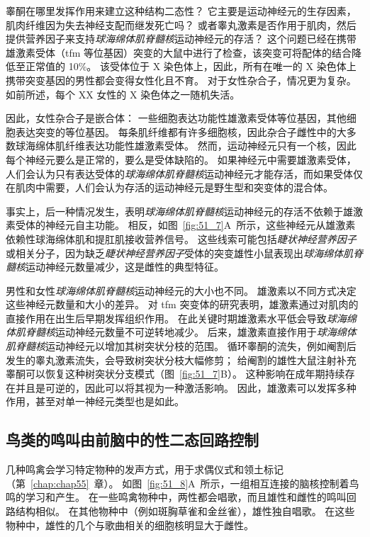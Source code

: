 睾酮在哪里发挥作用来建立这种结构二态性？
它主要是运动神经元的生存因素，肌肉纤维因为失去神经支配而继发死亡吗？
或者睾丸激素是否作用于肌肉，然后提供营养因子来支持\textit{球海绵体肌脊髓核}运动神经元的存活？
这个问题已经在携带雄激素受体（tfm 等位基因）突变的大鼠中进行了检查，该突变可将配体的结合降低至正常值的 10\%。
该受体位于 X 染色体上，因此，所有在唯一的 X 染色体上携带突变基因的男性都会变得女性化且不育。
对于女性杂合子，情况更为复杂。
如前所述，每个 XX 女性的 X 染色体之一随机失活。


因此，女性杂合子是嵌合体：
一些细胞表达功能性雄激素受体等位基因，其他细胞表达突变的等位基因。
每条肌纤维都有许多细胞核，因此杂合子雌性中的大多数球海绵体肌纤维表达功能性雄激素受体。
然而，运动神经元只有一个核，因此每个神经元要么是正常的，要么是受体缺陷的。
如果神经元中需要雄激素受体，人们会认为只有表达受体的\textit{球海绵体肌脊髓核}运动神经元才能存活，而如果受体仅在肌肉中需要，人们会认为存活的运动神经元是野生型和突变体的混合体。


事实上，后一种情况发生，表明\textit{球海绵体肌脊髓核}运动神经元的存活不依赖于雄激素受体的神经元自主功能。
相反，如图~\ref{fig:51_7}A~所示，这些神经元从雄激素依赖性球海绵体肌和提肛肌接收营养信号。
这些线索可能包括\textit{睫状神经营养因子}或相关分子，因为缺乏\textit{睫状神经营养因子}受体的突变雄性小鼠表现出\textit{球海绵体肌脊髓核}运动神经元数量减少，这是雌性的典型特征。


男性和女性\textit{球海绵体肌脊髓核}运动神经元的大小也不同。
雄激素以不同方式决定这些神经元数量和大小的差异。
对 tfm 突变体的研究表明，雄激素通过对肌肉的直接作用在出生后早期发挥组织作用。
在此关键时期雄激素水平低会导致\textit{球海绵体肌脊髓核}运动神经元数量不可逆转地减少。
后来，雄激素直接作用于\textit{球海绵体肌脊髓核}运动神经元以增加其树突状分枝的范围。
循环睾酮的流失，例如阉割后发生的睾丸激素流失，会导致树突状分枝大幅修剪；
给阉割的雄性大鼠注射补充睾酮可以恢复这种树突状分支模式（图~\ref{fig:51_7}B）。
这种影响在成年期持续存在并且是可逆的，因此可以将其视为一种激活影响。
因此，雄激素可以发挥多种作用，甚至对单一神经元类型也是如此。



\subsection{鸟类的鸣叫由前脑中的性二态回路控制}

几种鸣禽会学习特定物种的发声方式，用于求偶仪式和领土标记（第~\ref{chap:chap55}~章）。
如图~\ref{fig:51_8}A~所示，一组相互连接的脑核控制着鸟鸣的学习和产生。
在一些鸣禽物种中，两性都会唱歌，而且雄性和雌性的鸣叫回路结构相似。
在其他物种中（例如斑胸草雀和金丝雀），雄性独自唱歌。
在这些物种中，雄性的几个与歌曲相关的细胞核明显大于雌性。


